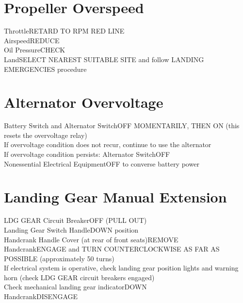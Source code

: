 \documentclass{article}
\begin{document}
\begin{multicols*}{2}
\section*{Propeller Overspeed}
Throttle\dotfill RETARD TO RPM RED LINE\\
Airspeed\dotfill REDUCE\\
Oil Pressure\dotfill CHECK\\
Land\dotfill SELECT NEAREST SUITABLE SITE and follow LANDING EMERGENCIES procedure
\section*{Alternator Overvoltage}
Battery Switch and Alternator Switch\dotfill OFF MOMENTARILY, THEN ON (this resets the overvoltage relay)\\
If overvoltage condition does not recur, continue to use the alternator\\
If overvoltage condition persists:
\hspace*{6mm} Alternator Switch\dotfill OFF\\
\hspace*{6mm} Nonessential Electrical Equipment\dotfill OFF to converse battery power
\section*{Landing Gear Manual Extension}
LDG GEAR Circuit Breaker\dotfill OFF (PULL OUT)\\
Landing Gear Switch Handle\dotfill DOWN position\\
Handcrank Handle Cover (at rear of front seats)\dotfill REMOVE\\
Handcrank\dotfill ENGAGE and TURN COUNTERCLOCKWISE AS FAR AS POSSIBLE (approximately 50 turns)\\
If electrical system is operative, check landing gear position lights and warning horn (check LDG GEAR circuit breakers engaged)\\
Check mechanical landing gear indicator\dotfill DOWN\\
Handcrank\dotfill DISENGAGE
\end{multicols*}
\end{document}
